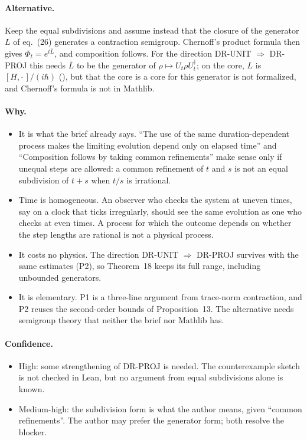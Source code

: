 \documentclass[11pt]{article}
\begin{document}
\paragraph{Alternative.} Keep the equal subdivisions and assume instead that the closure of the
generator $L$ of eq.~(26) generates a contraction semigroup. Chernoff's product formula then gives
$\Phi_t = e^{t\bar L}$, and composition follows. For the direction DR-UNIT $\Rightarrow$ DR-PROJ
this needs $\bar L$ to be the generator of $\rho \mapsto U_t\rho U_t^\dagger$; on the core, $L$ is
$[H,\cdot\,]/(i\hbar)$ (), but that the core is a core for this
generator is not formalized, and Chernoff's formula is not in Mathlib.

\paragraph{Why.}
\begin{itemize}
\item It is what the brief already says. ``The use of the same duration-dependent process makes
  the limiting evolution depend only on elapsed time'' and ``Composition follows by taking common
  refinements'' make sense only if unequal steps are allowed: a common refinement of $t$ and $s$
  is not an equal subdivision of $t+s$ when $t/s$ is irrational.
\item Time is homogeneous. An observer who checks the system at uneven times, say on a clock that
  ticks irregularly, should see the same evolution as one who checks at even times. A process for
  which the outcome depends on whether the step lengths are rational is not a physical process.
\item It costs no physics. The direction DR-UNIT $\Rightarrow$ DR-PROJ survives with the same
  estimates (P2), so Theorem~18 keeps its full range, including unbounded generators.
\item It is elementary. P1 is a three-line argument from trace-norm contraction, and P2 reuses
  the second-order bounds of Proposition~13. The alternative needs semigroup theory that neither
  the brief nor Mathlib has.
\end{itemize}

\paragraph{Confidence.}
\begin{itemize}
\item High: some strengthening of DR-PROJ is needed. The counterexample sketch is not checked in
  Lean, but no argument from equal subdivisions alone is known.
\item Medium-high: the subdivision form is what the author means, given ``common refinements''.
  The author may prefer the generator form; both resolve the blocker.
\end{itemize}
\end{document}
